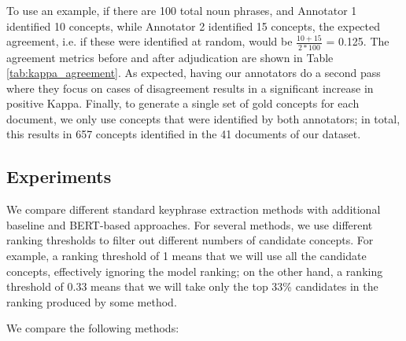 \documentclass[thesis.tex]{subfiles}
\begin{document}
To use an example, if there are 100 total noun phrases, and Annotator 1 identified 10 concepts, while Annotator 2 identified 15 concepts, the expected agreement, i.e. if these were identified at random, would be $\frac{10 + 15}{2*100}$ = 0.125. The agreement metrics before and after adjudication are shown in Table \ref{tab:kappa_agreement}. As expected, having our annotators do a second pass where they focus on cases of disagreement results in a significant increase in positive Kappa. Finally, to generate a single set of gold concepts for each document, we only use concepts that were identified by both annotators; in total, this results in 657 concepts identified in the 41 documents of our dataset.

\subsection{Experiments}

We compare different standard keyphrase extraction methods with additional baseline and BERT-based approaches. For several methods, we use different ranking thresholds to filter out different numbers of candidate concepts. For example, a ranking threshold of 1 means that we will use all the candidate concepts, effectively ignoring the model ranking; on the other hand, a ranking threshold of 0.33 means that we will take only the top 33\% candidates in the ranking produced by some method.

We compare the following methods:
\end{document}
